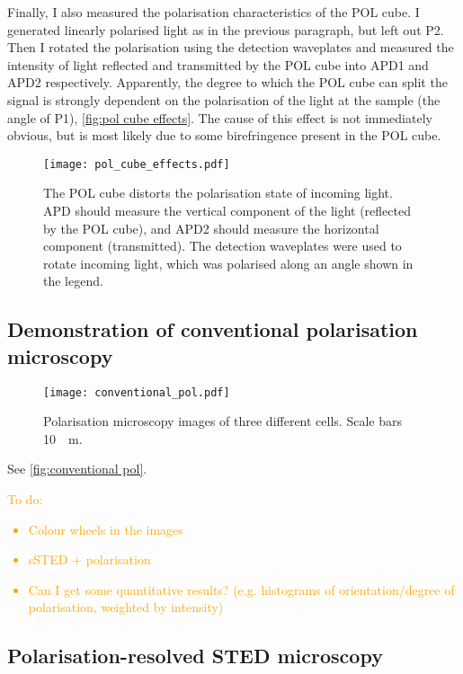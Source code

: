 Finally, I also measured the polarisation characteristics of the POL cube. I generated linearly polarised light as in the previous paragraph, but left out P2. Then I rotated the polarisation using the detection waveplates and measured the intensity of light reflected and transmitted by the POL cube into APD1 and APD2 respectively. Apparently, the degree to which the POL cube can split the signal is strongly dependent on the polarisation of the light at the sample (the angle of P1), \autoref{fig:pol cube effects}. The cause of this effect is not immediately obvious, but is most likely due to some birefringence present in the POL cube. 

\begin{figure}
	\centering
	\texttt{[image: pol\_cube\_effects.pdf]}
	\caption{The POL cube distorts the polarisation state of incoming light. APD should measure the vertical component of the light (reflected by the POL cube), and APD2 should measure the horizontal component (transmitted). The detection waveplates were used to rotate incoming light, which was polarised along an angle shown in the legend.}
	\label{fig:pol cube effects}
\end{figure}

\subsection{Demonstration of conventional polarisation microscopy}

\begin{figure}
	\centering
	\texttt{[image: conventional\_pol.pdf]}
	\caption{
		Polarisation microscopy images of three different cells. Scale bars \SI{10}{\mu m}.
	}
	\label{fig:conventional pol}
\end{figure}

See \autoref{fig:conventional pol}.

\textcolor{orange}{
	To do:
	\begin{itemize}
		\item Colour wheels in the images
		\item sSTED + polarisation
		\item Can I get some quantitative results? (e.g. histograms of orientation/degree of polarisation, weighted by intensity)
	\end{itemize}
} 

\subsection{Polarisation-resolved STED microscopy}

